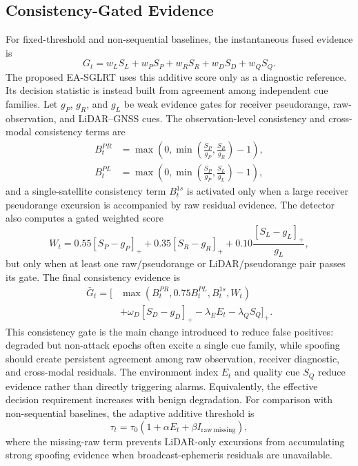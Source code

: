 \documentclass[journal]{IEEEtran}
\begin{document}
\subsection{Consistency-Gated Evidence}
For fixed-threshold and non-sequential baselines, the instantaneous fused evidence is
\begin{equation}
G_t=w_L S_L+w_P S_P+w_R S_R+w_D S_D+w_Q S_Q .
\end{equation}
The proposed EA-SGLRT uses this additive score only as a diagnostic reference.
Its decision statistic is instead built from agreement among independent cue families.
Let $g_P$, $g_R$, and $g_L$ be weak evidence gates for receiver pseudorange, raw-observation, and LiDAR--GNSS cues.
The observation-level consistency and cross-modal consistency terms are
\begin{align}
B^{PR}_t &= \max\left(0,\min\left(\frac{S_P}{g_P},\frac{S_R}{g_R}\right)-1\right),\\
B^{PL}_t &= \max\left(0,\min\left(\frac{S_P}{g_P},\frac{S_L}{g_L}\right)-1\right),
\end{align}
and a single-satellite consistency term $B^{1s}_t$ is activated only when a large receiver pseudorange excursion is accompanied by raw residual evidence.
The detector also computes a gated weighted score
\begin{equation}
W_t=
0.55[S_P-g_P]_+ + 0.35[S_R-g_R]_+
+0.10\frac{[S_L-g_L]_+}{g_L},
\end{equation}
but only when at least one raw/pseudorange or LiDAR/pseudorange pair passes its gate.
The final consistency evidence is
\begin{align}
\bar{G}_t = \Big[&
\max(B^{PR}_t,0.75B^{PL}_t,B^{1s}_t,W_t) \nonumber\\
&+\omega_D[S_D-g_D]_+ -\lambda_E E_t-\lambda_Q S_Q
\Big]_+ .
\end{align}
This consistency gate is the main change introduced to reduce false positives: degraded but non-attack epochs often excite a single cue family, while spoofing should create persistent agreement among raw observation, receiver diagnostic, and cross-modal residuals.
The environment index $E_t$ and quality cue $S_Q$ reduce evidence rather than directly triggering alarms.
Equivalently, the effective decision requirement increases with benign degradation.
For comparison with non-sequential baselines, the adaptive additive threshold is
\begin{equation}
\tau_t=\tau_0\left(1+\alpha E_t+\beta I_{\mathrm{raw\ missing}}\right),
\end{equation}
where the missing-raw term prevents LiDAR-only excursions from accumulating strong spoofing evidence when broadcast-ephemeris residuals are unavailable.
\end{document}
